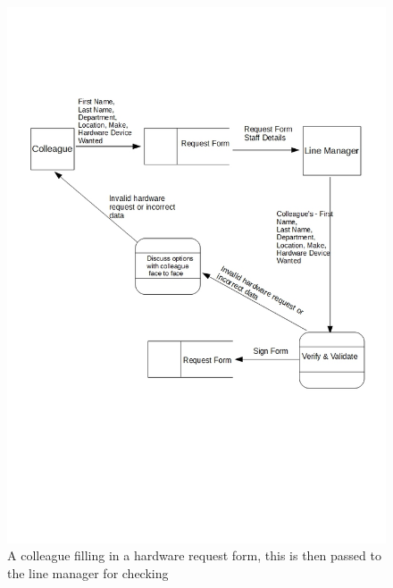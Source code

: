 \begin{figure}[H]
\includegraphics[width=\textwidth]{CurrentDFD.jpg}
\caption{A colleague filling in a hardware request form, this is then passed to the line manager for checking} \label{Page1Interview}
\end{figure}

